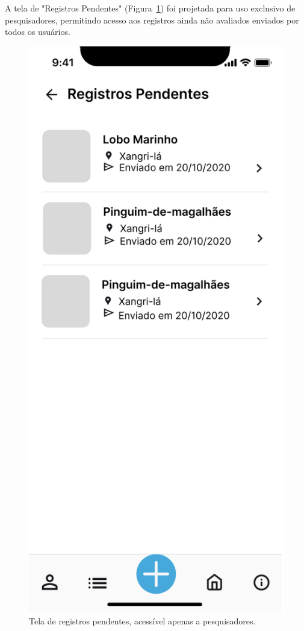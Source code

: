 A tela de "Registros Pendentes" (Figura~\ref{fig:prototipo-registros-pendentes}) foi projetada 
para uso exclusivo de pesquisadores, permitindo acesso aos registros ainda não avaliados enviados 
por todos os usuários.

\begin{figure}[H]
    \centering
    \includegraphics[height=0.6\textheight]{imagens/registro-pendente-figma.png}
    \caption{Tela de registros pendentes, acessível apenas a pesquisadores.}
    \label{fig:prototipo-registros-pendentes}
\end{figure}

